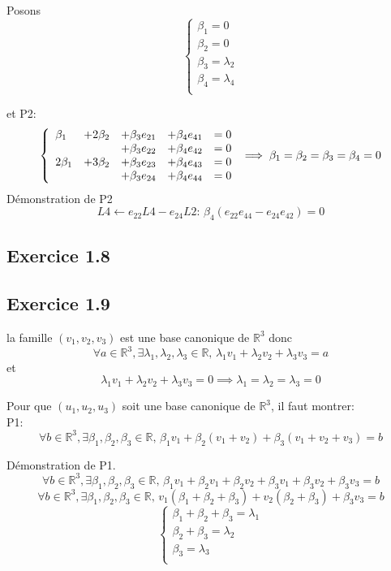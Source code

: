 \documentclass[]{book}
\theoremstyle{definition}
\newcommand{\bb}[1]{\mathbb{#1}}
\newcommand{\R}{\bb{R}}
\begin{document}
Posons
$$
\left\{ 
\begin{array}{l}
   \beta_1 = 0 \\
   \beta_2 = 0 \\
   \beta_3 = \lambda_2 \\
   \beta_4 = \lambda_4 \\
\end{array}
\right. 
$$


et P2:
$$
\left\{ 
\begin{array}{l l l l l}
  \beta_1  & +2\beta_2 & +\beta_3 e_{21} & +\beta_4 e_{41} & = 0 \\
           &           & +\beta_3 e_{22} & +\beta_4 e_{42} & = 0 \\
  2\beta_1 & +3\beta_2 & +\beta_3 e_{23} & +\beta_4 e_{43} & = 0 \\
             &             & +\beta_3 e_{24} & +\beta_4 e_{44} & = 0 \\
\end{array}
\right. 
\implies
\beta_1=\beta_2=\beta_3=\beta_4=0
$$
D\'emonstration de P2\\


$$L4 \leftarrow e_{22}L4-e_{24}L2:\,  \beta_4 (e_{22}e_{44}-e_{24}e_{42}) = 0$$

\subsection*{Exercice 1.8}

\subsection*{Exercice 1.9}
la famille $(v_1, v_2, v_3)$ est une base canonique de $\R^3$ donc
$$ \forall a \in \R^3, \exists \lambda_1,\lambda_2,\lambda_3 \in \R,\,
\lambda_1 v_{1} +\lambda_2 v_{2} +\lambda_3 v_{3} = a 
$$
et
$$
\lambda_1 v_{1} +\lambda_2 v_{2} +\lambda_3 v_{3} = 0
\implies
\lambda_1=\lambda_2=\lambda_3=0
$$

Pour que $(u_1, u_2, u_3)$ soit une base canonique de $\R^3$, il faut montrer:\\
P1:
$$ \forall b \in \R^3, \exists \beta_1,\beta_2,\beta_3 \in \R,\,
\beta_1 v_{1} + \beta_2 (v_{1} + v_{2}) +\beta_3 (v_{1} + v_{2} + v_{3}) = b 
$$

D\'emonstration de P1.
$$ \forall b \in \R^3, \exists \beta_1,\beta_2,\beta_3 \in \R,\,
\beta_1 v_{1} + \beta_2 v_{1} + \beta_2 v_{2} +\beta_3 v_{1} + \beta_3 v_{2} + \beta_3 v_{3} = b
$$
$$ \forall b \in \R^3, \exists \beta_1,\beta_2,\beta_3 \in \R,\,
v_{1} (\beta_1 + \beta_2 + \beta_3) + v_{2} (\beta_2 + \beta_3) + \beta_3 v_{3} = b
$$
$$
\left\{ 
\begin{array}{l}
   \beta_1 + \beta_2 + \beta_3 = \lambda_1 \\
   \beta_2 + \beta_3 = \lambda_2 \\
   \beta_3 = \lambda_3 \\
\end{array}
\right. 
$$
\end{document}
